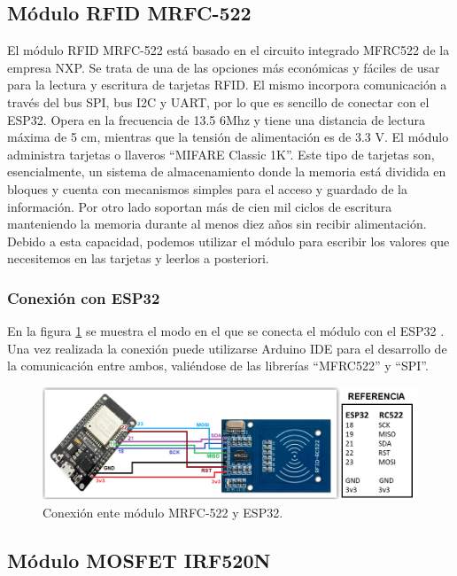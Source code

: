 \subsection{Módulo RFID MRFC-522}

El módulo RFID MRFC-522 está basado en el circuito integrado MFRC522 de la empresa NXP. Se trata de una de las opciones más económicas y fáciles de usar para la lectura y escritura de tarjetas RFID. El mismo incorpora comunicación a través del bus SPI, bus I2C y UART, por lo que es sencillo de conectar con el ESP32. Opera en la frecuencia de 13.5 6Mhz y tiene una distancia de lectura máxima de 5 cm, mientras que la tensión de alimentación es de 3.3 V. El módulo administra tarjetas o llaveros ``MIFARE Classic 1K''. Este tipo de tarjetas son, esencialmente, un sistema de almacenamiento donde la memoria está dividida en bloques y cuenta con mecanismos simples para el acceso y guardado de la información. Por otro lado soportan más de cien mil ciclos de escritura manteniendo la memoria durante al menos diez años sin recibir alimentación. Debido a esta capacidad, podemos utilizar el módulo para escribir los valores que necesitemos en las tarjetas y leerlos a posteriori. 

\subsubsection{Conexión con ESP32}

En la figura \ref{fig:mrf522} se muestra el modo en el que se conecta el módulo con el ESP32 \citep{WEBSITE:MRF522}. Una vez realizada la conexión puede utilizarse Arduino IDE para el desarrollo de la comunicación entre ambos, valiéndose de las librerías ``MFRC522'' y ``SPI''.

\begin{figure}[ht]
	\centering
	\includegraphics[width=1\textwidth]{./Figures/mrf522.png}
	\caption{Conexión ente módulo MRFC-522 y ESP32.}
	\label{fig:mrf522}
\end{figure} 


\subsection{Módulo MOSFET IRF520N}

